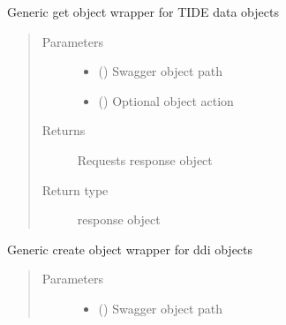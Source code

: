 \documentclass[letterpaper,10pt,english]{sphinxmanual}
\begin{document}
\begin{fulllineitems}
\begin{fulllineitems}
\label{\detokenize{b1td-class:bloxone.b1td.get}}
\sphinxAtStartPar
Generic get object wrapper for TIDE data objects
\begin{quote}\begin{description}
\item[{Parameters}] \leavevmode\begin{itemize}
\item {} 
\sphinxAtStartPar
{} () \textendash{} Swagger object path

\item {} 
\sphinxAtStartPar
{} () \textendash{} Optional object action

\end{itemize}

\item[{Returns}] \leavevmode
\sphinxAtStartPar
Requests response object

\item[{Return type}] \leavevmode
\sphinxAtStartPar
response object

\end{description}\end{quote}

\end{fulllineitems}


\begin{fulllineitems}
\label{\detokenize{b1td-class:bloxone.b1td.post}}
\sphinxAtStartPar
Generic create object wrapper for ddi objects
\begin{quote}\begin{description}
\item[{Parameters}] \leavevmode\begin{itemize}
\item {} 
\sphinxAtStartPar
{} () \textendash{} Swagger object path


\end{itemize}
\end{description}
\end{quote}
\end{fulllineitems}
\end{fulllineitems}
\end{document}
